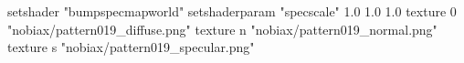 setshader "bumpspecmapworld"
setshaderparam "specscale" 1.0 1.0 1.0
    texture 0 "nobiax/pattern019_diffuse.png"
    texture n "nobiax/pattern019_normal.png"
    texture s "nobiax/pattern019_specular.png"